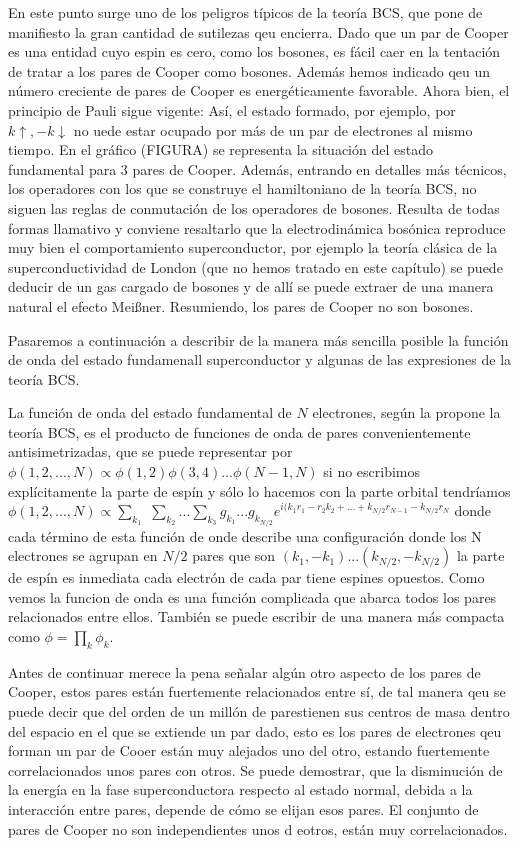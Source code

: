 En este punto surge uno de los peligros típicos de la teoría BCS, que pone de manifiesto la gran cantidad de sutilezas qeu encierra. Dado que un par de Cooper es una entidad cuyo espin es cero, como los bosones, es fácil caer en la tentación de tratar a los pares de Cooper como bosones. Además hemos indicado qeu un número creciente de pares de Cooper es energéticamente favorable. Ahora bien, el principio de Pauli sigue vigente: Así, el estado formado, por ejemplo, por $k \uparrow, -k \downarrow$ no uede estar ocupado por más de un par de electrones al mismo tiempo. En el gráfico (FIGURA) se representa la situación del estado fundamental para 3 pares de Cooper. Además, entrando en detalles más técnicos, los operadores con los que se construye el hamiltoniano de la teoría BCS, no siguen las reglas de conmutación de los operadores de bosones. Resulta de todas formas llamativo y conviene resaltarlo que la electrodinámica bosónica reproduce muy bien el comportamiento superconductor, por ejemplo la teoría clásica de la superconductividad de London (que no hemos tratado en este capítulo) se puede deducir de un gas cargado de bosones y de allí se puede extraer de una manera natural el efecto Meißner. Resumiendo, los pares de Cooper no son bosones.

Pasaremos a continuación a describir de la manera más sencilla posible la función de onda del estado fundamenall superconductor y algunas de las expresiones de la teoría BCS.

La función de onda del estado fundamental de $N$ electrones, según la propone la teoría BCS, es el producto de funciones de onda de pares convenientemente antisimetrizadas, que se puede representar por $\phi(1,2,...,N) \propto \phi(1,2)\phi(3,4)...\phi(N-1,N)$ si no escribimos explícitamente la parte de espín y sólo lo hacemos con la parte orbital tendríamos $\phi(1,2,...,N) \propto \sum_{k_1}$ $\sum_{k_2} ... \sum_{k_3} g_{k_1} ... g_{k_{N/2}} e^{i (k_1 r_1 - r_2 k_2 + ... + k_{N/2} r_{N-1} - k_{N/2} r_N}$ donde cada término de esta función de onde describe una configuración donde los N electrones se agrupan en $N/2$ pares que son $(k_1, -k_1) ... (k_{N/2}, -k_{N/2})$ la parte de espín es inmediata cada electrón de cada par tiene espines opuestos. Como vemos la funcion de onda es una función complicada que abarca todos los pares relacionados entre ellos. También se puede escribir de una manera más compacta como $\phi = \prod\limits_k \phi_k$.

Antes de continuar merece la pena señalar algún otro aspecto de los pares de Cooper, estos pares están fuertemente relacionados entre sí, de tal manera qeu se puede decir que del orden de un millón de parestienen sus centros de masa dentro del espacio en el que se extiende un par dado, esto es los pares de electrones qeu forman un par de Cooer están muy alejados uno del otro, estando fuertemente correlacionados unos pares con otros. Se puede demostrar, que la disminución de la energía en la fase superconductora respecto al estado normal, debida a la interacción entre pares, depende de cómo se elijan esos pares. El conjunto de pares de Cooper no son independientes unos d eotros, están muy correlacionados.

